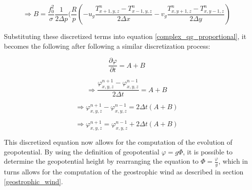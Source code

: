 \begin{equation}
    \Rightarrow B = \frac{f^2_0}{\sigma} \frac{1}{ 2 \Delta p} (\frac{R}{p} (-u_g \frac{T^{n}_{x+1, y, z} - T^{n}_{x-1, y, z}}{2 \Delta x} - v_g \frac{T^{n}_{x, y+1, z} - T^{n}_{x, y-1, z}}{2 \Delta y})
\end{equation}

Substituting these discretized terms into equation \ref{complex_qg_proportional}, it becomes the following after following a similar discretization process:

\begin{equation}
    \frac{\partial \varphi}{\partial t} = A + B
\end{equation}

\begin{equation}
    \Rightarrow \frac{\varphi^{n+1}_{x, y, z} - \varphi^{n-1}_{x, y, z}}{2 \Delta t} = A + B
\end{equation}

\begin{equation}
    \Rightarrow \varphi^{n+1}_{x, y, z} - \varphi^{n-1}_{x, y, z} = 2 \Delta t(A + B)
\end{equation}

\begin{equation}
    \Rightarrow \varphi^{n+1}_{x, y, z} = \varphi^{n-1}_{x, y, z} + 2 \Delta t(A + B)
\end{equation}

This discretized equation now allows for the computation of the evolution of geopotential. By using the definition of geopotential $\varphi = g \Phi$, it is possible to determine the geopotential height by rearranging the equation to $\Phi = \frac{\varphi}{g}$, which in turns allows for the computation of the geostrophic wind as described in section \ref{geostrophic_wind}\cite{quasi_geo}.
